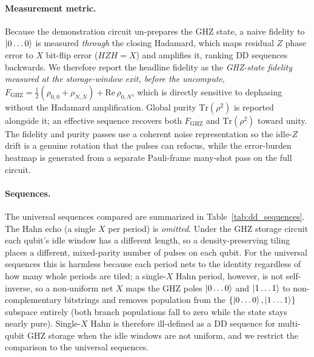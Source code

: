 \documentclass[10pt,twocolumn]{article}
\begin{document}
\paragraph{Measurement metric.}
Because the demonstration circuit un-prepares the GHZ state, a naive
fidelity to $\ket{0\dots0}$ is measured \textit{through} the closing
Hadamard, which maps residual $Z$ phase error to $X$ bit-flip error
($HZH = X$) and amplifies it, ranking DD sequences backwards. We therefore
report the headline fidelity as the \textit{GHZ-state fidelity measured at
the storage-window exit, before the uncompute},
$F_{\text{GHZ}} = \tfrac{1}{2}(\rho_{0,0} + \rho_{N,N}) +
\mathrm{Re}\,\rho_{0,N}$, which is directly sensitive to dephasing without
the Hadamard amplification. Global purity $\mathrm{Tr}(\rho^2)$ is reported
alongside it; an effective sequence recovers both $F_{\text{GHZ}}$ and
$\mathrm{Tr}(\rho^2)$ toward unity. The fidelity and purity passes use a
coherent noise representation so the idle-$Z$ drift is a genuine rotation
that the pulses can refocus, while the error-burden heatmap is generated
from a separate Pauli-frame many-shot pass on the full circuit.

\paragraph{Sequences.}
The universal sequences compared are summarized in
Table~\ref{tab:dd_sequences}. The Hahn echo (a single $X$ per period) is
\textit{omitted}. Under the GHZ storage circuit each qubit's idle window
has a different length, so a density-preserving tiling places a different,
mixed-parity number of pulses on each qubit. For the universal sequences
this is harmless because each period nets to the identity regardless of how
many whole periods are tiled; a single-$X$ Hahn period, however, is not
self-inverse, so a non-uniform net $X$ maps the GHZ poles $\ket{0\dots0}$
and $\ket{1\dots1}$ to non-complementary bitstrings and removes population
from the $\{\ket{0\dots0}, \ket{1\dots1}\}$ subspace entirely (both branch
populations fall to zero while the state stays nearly pure). Single-$X$
Hahn is therefore ill-defined as a DD sequence for multi-qubit GHZ storage
when the idle windows are not uniform, and we restrict the comparison to
the universal sequences.
\end{document}
